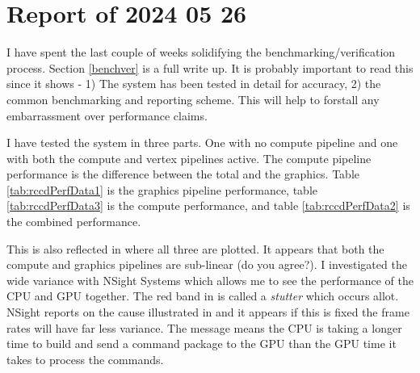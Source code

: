 \section{Report of 2024 05 26}

I have spent the last couple of weeks solidifying the benchmarking/verification process. Section \ref{benchver}  is a full write up. It is probably important to read this since it shows - 1) The system has been tested in detail for accuracy, 2) the common benchmarking and reporting scheme. This will help to forstall any embarrassment over performance claims.

I have tested the system in three parts. One with no compute pipeline and one with both the compute and vertex pipelines active. The compute pipeline performance is the difference between the total and the graphics. Table \ref{tab:rccdPerfData1} is the graphics pipeline performance, table \ref{tab:rccdPerfData3} is the compute performance, and table  \ref{tab:rccdPerfData2} is the combined performance.

This is also reflected in  where all three are plotted. It appears that both the compute and graphics pipelines are sub-linear (do you agree?).
I investigated the wide variance with NSight Systems which allows me to see the performance of the CPU and GPU together. The red band in  is called a \textit{stutter} which occurs allot. NSight reports on the cause illustrated in  and it appears if this is fixed the frame rates will have far less variance. 
The message means the CPU is taking a longer time to build and send a command package to the GPU than the GPU time it takes to process the commands.








\newpage
\clearpage



%
%
%
%

%

%

%

